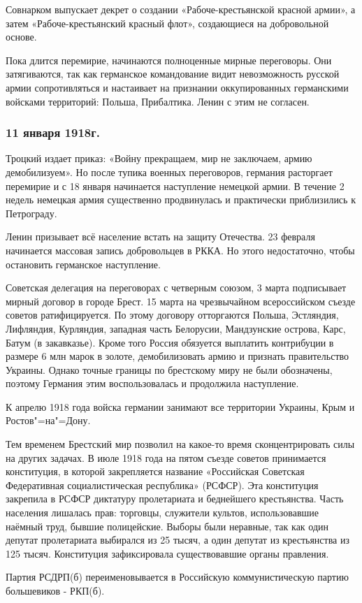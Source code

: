 Совнарком выпускает декрет о создании «Рабоче-крестьянской красной армии», а затем «Рабоче-крестьянский красный флот», создающиеся на добровольной основе.

Пока длится перемирие, начинаются полноценные мирные переговоры. Они затягиваются, так как германское командование видит невозможность русской армии сопротивляться и настаивает на признании оккупированных германскими войсками территорий: Польша, Прибалтика. Ленин с этим не согласен.

\subsubsection{\textbf{11 января 1918г.}}

Троцкий издает приказ: «Войну прекращаем, мир не заключаем, армию демобилизуем». Но после тупика военных переговоров, германия расторгает перемирие и с 18 января начинается наступление немецкой армии. В течение 2 недель немецкая армия существенно продвинулась и практически приблизились к Петрограду.

Ленин призывает всё население встать на защиту Отечества. 23 февраля начинается массовая запись добровольцев в РККА. Но этого недостаточно, чтобы остановить германское наступление.

Советская делегация на переговорах с четверным союзом, 3 марта подписывает мирный договор в городе Брест. 15 марта на чрезвычайном всероссийском съезде советов ратифицируется. По этому договору отторгаются Польша, Эстляндия, Лифляндия, Курляндия, западная часть Белорусии, Мандзунские острова, Карс, Батум (в закавказье). Кроме того Россия обязуется выплатить контрибуции в размере 6 млн марок в золоте, демобилизовать армию и признать правительство Украины. Однако точные границы по брестскому миру не были обозначены, поэтому Германия этим воспользовалась и продолжила наступление.

К апрелю 1918 года войска германии занимают все территории Украины, Крым и Ростов"=на"=Дону.

Тем временем Брестский мир позволил на какое-то время сконцентрировать силы на других задачах. В июле 1918 года на пятом съезде советов принимается конституция, в которой закрепляется название «Российская Советская Федеративная социалистическая республика» (РСФСР). Эта конституция закрепила в РСФСР диктатуру пролетариата и беднейшего крестьянства. Часть населения лишалась прав: торговцы, служители культов, использовавшие наёмный труд, бывшие полицейские. Выборы были неравные, так как один депутат пролетариата выбирался из 25 тысяч, а один депутат из крестьянства из 125 тысяч. Конституция зафиксировала существовавшие органы правления.

Партия РСДРП(б) переименовывается в Российскую коммунистическую партию большевиков - РКП(б).